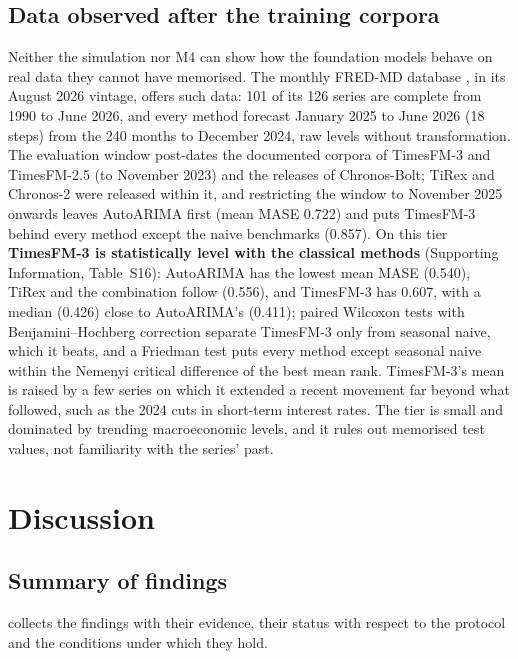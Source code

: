 

\subsection{Data observed after the training corpora}
\label{sec:postcutoff}

Neither the simulation nor M4 can show how the foundation models behave on real data they cannot have
memorised. The monthly FRED-MD database \citep{mccracken2016fredmd}, in its August 2026 vintage, offers such
data: 101 of its 126 series are complete from 1990 to June 2026, and every method forecast January 2025 to
June 2026 (18 steps) from the 240 months to December 2024, raw levels without transformation. The evaluation
window post-dates the documented corpora of TimesFM-3 and TimesFM-2.5 (to November 2023) and the releases of
Chronos-Bolt; TiRex and Chronos-2 were released within it, and restricting the window to November 2025
onwards leaves AutoARIMA first (mean MASE 0.722) and puts TimesFM-3 behind every method except the naive
benchmarks (0.857). On this tier \textbf{TimesFM-3 is statistically level with the classical methods}
(Supporting Information, Table~S16): AutoARIMA has the lowest mean MASE (0.540), TiRex and the combination
follow (0.556), and TimesFM-3 has 0.607, with a median (0.426) close to AutoARIMA's (0.411); paired Wilcoxon
tests with Benjamini--Hochberg correction separate TimesFM-3 only from seasonal naive, which it beats, and a
Friedman test puts every method except seasonal naive within the Nemenyi critical difference of the best
mean rank.
TimesFM-3's mean is raised by a few series on which it extended a recent movement far beyond what followed,
such as the 2024 cuts in short-term interest rates. The tier is small and dominated by trending
macroeconomic levels, and it rules out memorised test values, not familiarity with the series' past.

\section{Discussion}
\label{sec:discussion}

\subsection{Summary of findings}
\label{sec:findings}

 collects the findings with their evidence, their status with respect to the protocol
and the conditions under which they hold.

